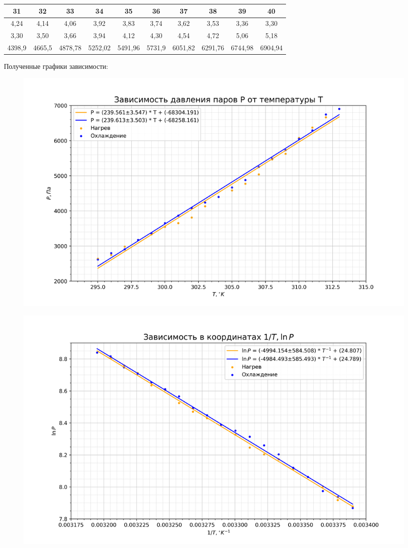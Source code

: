 \documentclass[a4paper, 12pt]{article}
\begin{document}
\begin{table}[h!]
\begin{tabular}{|c|c|c|c|c|c|c|c|c|c|}
\hline
31     & 32     & 33      & 34      & 35      & 36     & 37      & 38      & 39      & 40      \\ \hline
4,24   & 4,14   & 4,06    & 3,92    & 3,83    & 3,74   & 3,62    & 3,53    & 3,36    & 3,30    \\ \hline
3,30   & 3,50   & 3,66    & 3,94    & 4,12    & 4,30   & 4,54    & 4,72    & 5,06    & 5,18    \\ \hline
4398,9 & 4665,5 & 4878,78 & 5252,02 & 5491,96 & 5731,9 & 6051,82 & 6291,76 & 6744,98 & 6904,94 \\ \hline
\end{tabular}
\end{table}

Полученные графики зависимости:\par

\begin{figure}[h!]
\begin{flushleft}
    \includegraphics[scale=0.75]{2.4.1_1.png}
\end{flushleft}
\caption{}
\end{figure}

\begin{figure}[h!]
\begin{flushleft}
    \includegraphics[scale=0.75]{2.4.1_2.png}
\end{flushleft}
\caption{}
\end{figure}
\end{document}
